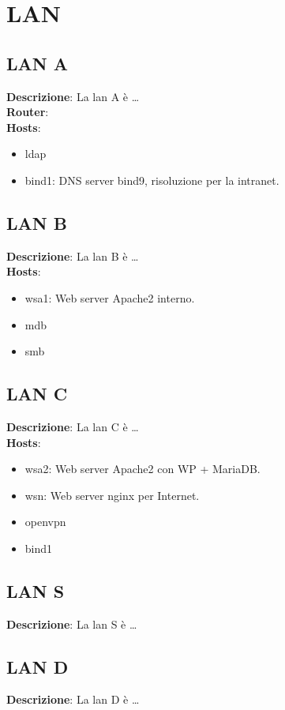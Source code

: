 \documentclass[a4paper,12pt]{article}
\begin{document}
\section{LAN} \label{5-lan}
\subsection{LAN A} \label{51-lan-a}
\textbf{Descrizione}: La lan A è \dots \\
\textbf{Router}: \\
\textbf{Hosts}:
\begin{itemize}
    \item ldap
    \item bind1: DNS server bind9, risoluzione per la intranet.
\end{itemize}

\subsection{LAN B} \label{52-lan-b}
\textbf{Descrizione}: La lan B è \dots \\
\textbf{Hosts}:
\begin{itemize}
    \item wsa1: Web server Apache2 interno.
    \item mdb
    \item smb
\end{itemize}

\subsection{LAN C} \label{53-lan-c}
\textbf{Descrizione}: La lan C è \dots \\
\textbf{Hosts}:
\begin{itemize}
    \item wsa2: Web server Apache2 con WP + MariaDB.
    \item wsn: Web server nginx per Internet.
    \item openvpn
    \item bind1
\end{itemize}

\subsection{LAN S} \label{54-lan-s}
\textbf{Descrizione}: La lan S è \dots \\

\subsection{LAN D} \label{55-lan-d}
\textbf{Descrizione}: La lan D è \dots \\
\end{document}
